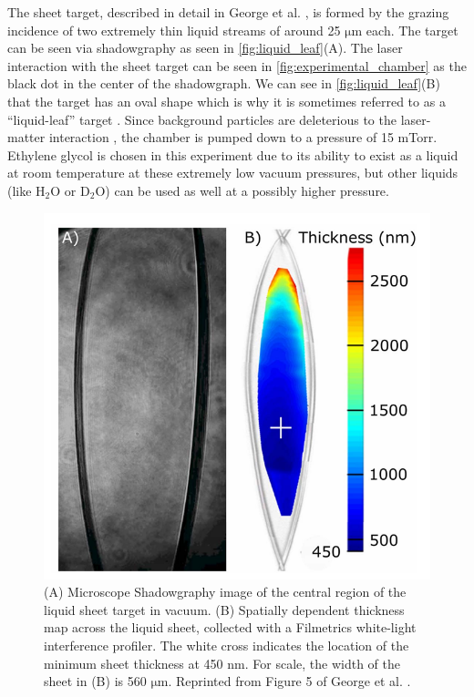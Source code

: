 The sheet target, described in detail in George et al. \cite{George_2019_HPLSE}, is formed by the grazing incidence of two extremely thin liquid streams of around 25 $\unit{\micro \meter}$ each. The target can be seen via shadowgraphy as seen in \autoref{fig:liquid_leaf}(A). The laser interaction with the sheet target can be seen in \autoref{fig:experimental_chamber} as the black dot in the center of the shadowgraph. We can see in \autoref{fig:liquid_leaf}(B) that the target has an oval shape which is why it is sometimes referred to as a ``liquid-leaf'' target \cite{Schmitz_2023_LaPB}. Since background particles are deleterious to the laser-matter interaction \cite{Snyder_2020_SciRep}, the chamber is pumped down to a pressure of 15 mTorr. Ethylene glycol is chosen in this experiment due to its ability to exist as a liquid at room temperature at these extremely low vacuum pressures, but other liquids (like $\text{H}_2\text{O}$ or $\text{D}_2\text{O}$) can be used as well at a possibly higher pressure.

\begin{figure}
	\centering 
	\includegraphics[width=0.75\linewidth]{planning/images/daq/target.PNG}
	\caption{(A) Microscope Shadowgraphy image of the central region of the liquid sheet target in vacuum. (B) Spatially dependent thickness map across the liquid sheet, collected with a Filmetrics white-light interference profiler. The white cross indicates the location of the minimum sheet thickness at 450 $\unit{\nano \meter}$. For scale, the width of the sheet in (B) is 560 $\unit{\micro \meter}$. Reprinted from Figure 5 of George et al. \cite{George_2019_HPLSE}.}
	\label{fig:liquid_leaf}
\end{figure}

